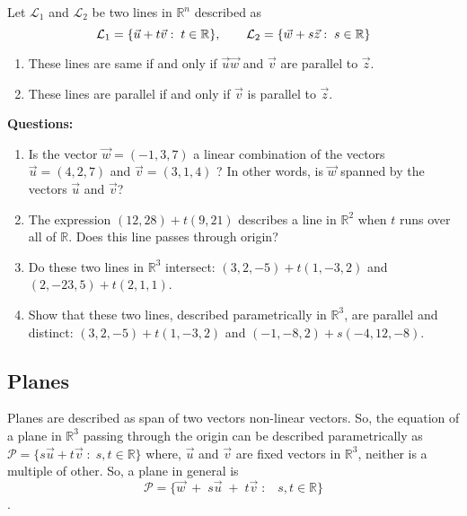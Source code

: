 \documentclass[math101_lecturenotes_ku.tex]{subfiles}
\begin{document}
\begin{theorem}
    Let $\mathcal{L}_1$ and $\mathcal{L}_2$ be two lines in ${\mathbb R}^n$ described as
    $$\mathcal{L}_1 = \{\vec{u}+t\vec{v}: \; t \in \mathbb{R}\}, \hspace{7mm} \mathcal{L}_2 = \{\vec{w}+s\vec{z}: \; s \in \mathbb{R}\} $$
    \begin{enumerate}
        \item These lines are same if and only if $\vec{u} \vec{w}$ and $\vec{v}$ are parallel to $\vec{z}$.
        \item These lines are parallel if and only if $\vec{v}$ is parallel to $\vec{z}$.
    \end{enumerate}
\end{theorem}
 \textbf{Questions:}
\begin{enumerate}
    \item Is the vector $\vec{w}= (-1,3,7)$ a linear combination of the vectors $\vec{u}=(4,2,7)$ and $\vec{v}=(3,1,4)$ ? In other words, is $\vec{w}$ spanned by the vectors $\vec{u}$ and $\vec{v}$?

    \item  The expression $(12,28)+t(9,21)$ describes a line in ${\mathbb R}^2$ when $t$ runs over all of ${\mathbb R}$. Does this line passes through origin?

    \item Do these two lines in ${\mathbb R}^3$ intersect: $(3,2,-5)+t(1,-3,2)$ and $(2,-23,5)+t(2,1,1)$.

    \item Show that these two lines, described parametrically in $\mathbb{R}^3$, are parallel and distinct: $(3,2,-5)+t(1,-3,2)$ and $(-1,-8,2) +s(-4,12,-8)$.
    \end{enumerate}


\subsection{Planes}
Planes are described as span of two vectors non-linear vectors. So, the equation of a plane in $\mathbb{R}^3$ passing through the origin can be described parametrically as $\mathcal{P}=\{s\vec{u}+t\vec{v}\; :\; s,t \in \mathbb{R}\}$ where, $\vec{u}$ and $\vec{v}$ are fixed vectors in $\mathbb{R}^3$, neither is a multiple of other. So, a plane in general is $$\mathcal{P}=\{\vec{w}\; + \;s\vec{u} \; + \; t\vec{v}\; :\;\;\; s,t \in \mathbb{R}\}$$.
\end{document}
